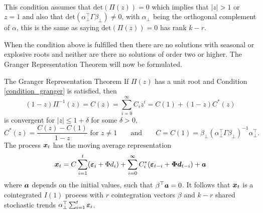\begin{condition}\phantom{}\\
    This condition assumes that $\text{det}(\Pi(z))=0$ which implies that $|z|>1$ or $z=1$ and also that $\text{det}(\alpha^\top_{\perp}\Gamma \beta_{\perp})\neq0$, with $\alpha_{\perp}$ being the orthogonal complement of $\alpha$, this is the same as saying $\text{det}(\Pi(z))=0$ has rank $k-r$.
    \label{condition_granger}
\end{condition}

\noindent When the condition above is fulfilled then there are no solutions with seasonal or explosive roots and neither are there no solutions of order two or higher. The Granger Representation Theorem will now be formulated.
\begin{thm}{The Granger Representation Theorem}
    If $\Pi(z)$ has a unit root and Condition \ref{condition_granger} is satisfied, then
    \begin{equation}\label{Granger_representation_eq_1}
        (1-z)\Pi^{-1}(z)=C(z)=\sum^{\infty}_{i=0}C_iz^i=C(1)+(1-z)C^\ast(z)
    \end{equation}
    is convergent for $|z|\leq1+\delta
    $ for some $\delta>0$,
    \begin{equation*}
C^{\ast}(z)=\frac{C(z)-C(1)}{1-z}\text{ for }z\neq 1\;\;\;\;\;\;\;\text{and}\;\;\;\;\;\;\;C=C(1)=\beta_\perp(\alpha^\top_{\perp}\Gamma\beta_{\perp})^{-1}\alpha^\top_{\perp}.
    \end{equation*}
The process $\boldsymbol{x}_t$ has the moving average representation
\begin{equation}\label{granger_representation_eq_3}
    \boldsymbol{x}_t=C\sum_{i=1}^{t}(\boldsymbol{\varepsilon}_{i}+\Phi d_i)+\sum_{i=0}^{\infty}C_{i}^\ast(\boldsymbol{\varepsilon}_{t-i}+\boldsymbol{\Phi} \boldsymbol{d}_{t-i})+\boldsymbol{a}
\end{equation}
where $\boldsymbol{a}$ depends on the initial values, such that $\beta^\top\boldsymbol{a}=0$. It follows that $\boldsymbol{x}_t$ is a cointegrated $I(1)$ process with $r$ cointegration vectors $\beta$ and $k-r$ shared stochastic trends $\alpha^\top_{\perp}\sum_{i=1}^{t}\boldsymbol{\varepsilon}_i$.
\end{thm}
